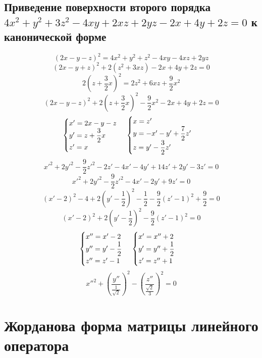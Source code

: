 \documentclass[12pt]{article}
\begin{document}
    \subsection{Приведение поверхности второго порядка $4x^2 + y^2 + 3z^2 - 4xy + 2xz + 2yz - 2x + 4y + 2z = 0$ к канонической форме}
    \[
        (2x - y - z)^2 = 4x^2 + y^2 + z^2 - 4xy - 4xz + 2yz
    \]
    \[
        (2x - y + z)^2 + 2(z^2 + 3xz) - 2x + 4y + 2z = 0
    \]
    \[
        2(z + \dfrac{3}{2}x)^2 = 2z^2 + 6xz + \dfrac{9}{2}x^2
    \]
    \[
        (2x - y - z)^2 + 2(z + \dfrac{3}{2}x)^2 - \dfrac{9}{2}x^2 - 2x + 4y + 2z = 0
    \]
    \[
        \begin{cases}
            x' = 2x - y - z        \\
            y' = z + \dfrac{3}{2}x \\
            z' = x
        \end{cases}
        \\
        \begin{cases}
            x = z'                        \\
            y = -x' - y' + \dfrac{7}{2}z' \\
            z = y' - \dfrac{3}{2}z'
        \end{cases}
    \]
    \[
        {x'}^2 + 2{y'}^2 - \dfrac{9}{2}{z'}^2 - 2z' - 4x' - 4y' + 14z' + 2y' - 3z' = 0
    \]
    \[
        {x'}^2 + 2{y'}^2 - \dfrac{9}{2}{z'}^2 - 4x' - 2y' + 9z' = 0
    \]
    \[
        (x' - 2)^2 - 4 + 2\left(y' - \dfrac{1}{2}\right)^2 - \dfrac{1}{2} - \dfrac{9}{2}\left(z' - 1\right)^2 + \dfrac{9}{2} = 0
    \]
    \[
        (x' - 2)^2 + 2\left(y' - \dfrac{1}{2}\right)^2 - \dfrac{9}{2}\left(z' - 1\right)^2 = 0
    \]
    \[
        \begin{cases}
            x'' = x' - 2            \\
            y'' = y' - \dfrac{1}{2} \\
            z'' = z' - 1
        \end{cases}
        \\
        \begin{cases}
            x' = x'' + 2            \\
            y' = y'' + \dfrac{1}{2} \\
            z' = z'' + 1
        \end{cases}
    \]
    \[
        {x''}^2 + \left(\dfrac{y''}{\frac{1}{\sqrt{2}}}\right)^2 - \left(\dfrac{z''}{\frac{\sqrt{2}}{3}}\right)^2 = 0
    \]

    \section{Жорданова форма матрицы линейного оператора}
\end{document}
